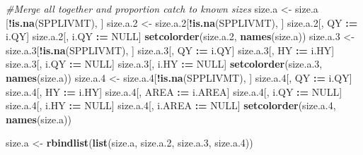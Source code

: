 \documentclass[]{article}
\newenvironment{Shaded}{\begin{snugshade}}{\end{snugshade}}
\newcommand{\KeywordTok}[1]{\textcolor[rgb]{0.13,0.29,0.53}{\textbf{#1}}}
\newcommand{\DecValTok}[1]{\textcolor[rgb]{0.00,0.00,0.81}{#1}}
\newcommand{\StringTok}[1]{\textcolor[rgb]{0.31,0.60,0.02}{#1}}
\newcommand{\CommentTok}[1]{\textcolor[rgb]{0.56,0.35,0.01}{\textit{#1}}}
\newcommand{\OtherTok}[1]{\textcolor[rgb]{0.56,0.35,0.01}{#1}}
\newcommand{\OperatorTok}[1]{\textcolor[rgb]{0.81,0.36,0.00}{\textbf{#1}}}
\newcommand{\ErrorTok}[1]{\textcolor[rgb]{0.64,0.00,0.00}{\textbf{#1}}}
\newcommand{\NormalTok}[1]{#1}
\begin{document}
\begin{Shaded}
\begin{Highlighting}[]
  \CommentTok{#Merge all together and proportion catch to known sizes}
\NormalTok{  size.a   <-}\StringTok{ }\NormalTok{size.a  [}\OperatorTok{!}\KeywordTok{is.na}\NormalTok{(SPPLIVMT), ]}
\NormalTok{  size.a.}\DecValTok{2}\NormalTok{ <-}\StringTok{ }\NormalTok{size.a.}\DecValTok{2}\NormalTok{[}\OperatorTok{!}\KeywordTok{is.na}\NormalTok{(SPPLIVMT), ]}
\NormalTok{  size.a.}\DecValTok{2}\NormalTok{[, QY   }\OperatorTok{:}\ErrorTok{=}\StringTok{ }\NormalTok{i.QY]}
\NormalTok{  size.a.}\DecValTok{2}\NormalTok{[, i.QY }\OperatorTok{:}\ErrorTok{=}\StringTok{ }\OtherTok{NULL}\NormalTok{]}
  \KeywordTok{setcolorder}\NormalTok{(size.a.}\DecValTok{2}\NormalTok{, }\KeywordTok{names}\NormalTok{(size.a))}
\NormalTok{  size.a.}\DecValTok{3}\NormalTok{ <-}\StringTok{ }\NormalTok{size.a.}\DecValTok{3}\NormalTok{[}\OperatorTok{!}\KeywordTok{is.na}\NormalTok{(SPPLIVMT), ]}
\NormalTok{  size.a.}\DecValTok{3}\NormalTok{[, QY     }\OperatorTok{:}\ErrorTok{=}\StringTok{ }\NormalTok{i.QY]}
\NormalTok{  size.a.}\DecValTok{3}\NormalTok{[, HY     }\OperatorTok{:}\ErrorTok{=}\StringTok{ }\NormalTok{i.HY]}
\NormalTok{  size.a.}\DecValTok{3}\NormalTok{[, i.QY }\OperatorTok{:}\ErrorTok{=}\StringTok{ }\OtherTok{NULL}\NormalTok{]}
\NormalTok{  size.a.}\DecValTok{3}\NormalTok{[, i.HY }\OperatorTok{:}\ErrorTok{=}\StringTok{ }\OtherTok{NULL}\NormalTok{]}
  \KeywordTok{setcolorder}\NormalTok{(size.a.}\DecValTok{3}\NormalTok{, }\KeywordTok{names}\NormalTok{(size.a))}
\NormalTok{  size.a.}\DecValTok{4}\NormalTok{ <-}\StringTok{ }\NormalTok{size.a.}\DecValTok{4}\NormalTok{[}\OperatorTok{!}\KeywordTok{is.na}\NormalTok{(SPPLIVMT), ]}
\NormalTok{  size.a.}\DecValTok{4}\NormalTok{[, QY     }\OperatorTok{:}\ErrorTok{=}\StringTok{ }\NormalTok{i.QY]}
\NormalTok{  size.a.}\DecValTok{4}\NormalTok{[, HY     }\OperatorTok{:}\ErrorTok{=}\StringTok{ }\NormalTok{i.HY]}
\NormalTok{  size.a.}\DecValTok{4}\NormalTok{[, AREA   }\OperatorTok{:}\ErrorTok{=}\StringTok{ }\NormalTok{i.AREA]}
\NormalTok{  size.a.}\DecValTok{4}\NormalTok{[, i.QY   }\OperatorTok{:}\ErrorTok{=}\StringTok{ }\OtherTok{NULL}\NormalTok{]}
\NormalTok{  size.a.}\DecValTok{4}\NormalTok{[, i.HY   }\OperatorTok{:}\ErrorTok{=}\StringTok{ }\OtherTok{NULL}\NormalTok{]}
\NormalTok{  size.a.}\DecValTok{4}\NormalTok{[, i.AREA }\OperatorTok{:}\ErrorTok{=}\StringTok{ }\OtherTok{NULL}\NormalTok{]}
  \KeywordTok{setcolorder}\NormalTok{(size.a.}\DecValTok{4}\NormalTok{, }\KeywordTok{names}\NormalTok{(size.a))}
  
\NormalTok{  size.a <-}\StringTok{ }\KeywordTok{rbindlist}\NormalTok{(}\KeywordTok{list}\NormalTok{(size.a, size.a.}\DecValTok{2}\NormalTok{, size.a.}\DecValTok{3}\NormalTok{, size.a.}\DecValTok{4}\NormalTok{))}
  

\end{Highlighting}
\end{Shaded}
\end{document}
